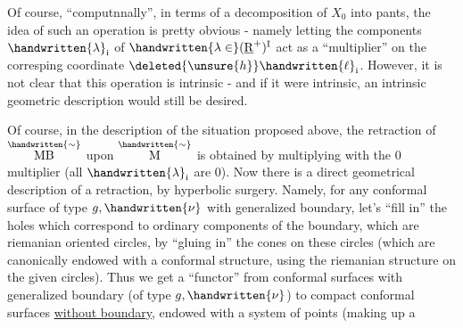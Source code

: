 Of course, ``computnnally'', in terms of a decomposition of $X_0$ into pants, the idea of such an operation is pretty obvious - namely letting the components $\handwritten{\lambda}_{\mathrm i}$ of $\handwritten{\lambda\in}(\underline{\mathrm R}^+)^{\mathrm I}$ act as a ``multiplier'' on the corresping coordinate $\deleted{\unsure{h}}\handwritten{\ell}_{\mathrm i}$. However, it is not clear that this operation is intrinsic - and if it were intrinsic, an intrinsic geometric description would still be  desired.

Of course, in the description of the situation proposed above, the retraction of $\overset{\handwritten{\sim}}{\mathrm{MB}}$ upon $\overset{\handwritten{\sim}}{\mathrm M}$ is obtained by multiplying with the 0 multiplier (all $\handwritten{\lambda}_{\mathrm i}$ are 0). Now there is a direct geometrical description of  a retraction, by hyperbolic surgery. Namely, for any  conformal surface of type $g,\handwritten{\nu}$ with generalized boundary, let's ``fill in'' the holes which correspond to ordinary components of the boundary, which are riemanian oriented circles, by ``gluing in'' the cones on these circles (which are canonically endowed with a conformal structure, using the riemanian structure on the given circles). Thus we get a ``functor'' from  conformal surfaces with generalized boundary (of type $g,\handwritten{\nu}$) to compact conformal surfaces \uline{without boundary}, endowed with a system of \handwritten{$\nu$} points (making up a
